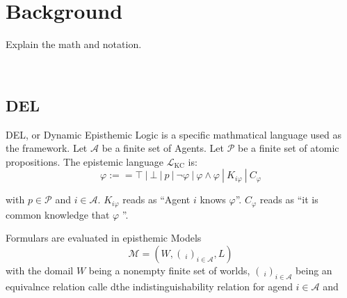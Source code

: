 \chapter{Background}\label{chap:background}
Explain the math and notation.

 \\

\section{DEL}
DEL, or Dynamic Episthemic Logic is a specific mathmatical language used as the framework.
Let $\mathcal{A}$ be a finite set of Agents. Let $\mathcal{P}$ be a finite set of atomic propositions.
The epistemic language $\mathcal{L}_{\text{KC}}$ is: \\
$$
\varphi :== \top \ | \ \bot \ | \ p \ | \ \neg \varphi \ | \ \varphi \wedge \varphi \ | \ K_{i\varphi} \ | \ C_\varphi
$$

with $p \in \mathcal{P}$ and $i \in \mathcal{A}$.
$K_{i\varphi}$ reads as ``Agent $i$ knows $\varphi$''. $C_\varphi$ reads as ``it is common knowledge that $\varphi$ ''.

Formulars are evaluated in episthemic Models
$$
\mathcal{M}=(W, (~_i)_{i \in \mathcal{A}}, L)
$$
with the domail $W$ being a nonempty finite set of worlds, $(~_i)_{i \in \mathcal{A}}$ being an equivalnce relation calle dthe indistinguishability relation for agend $i \in \mathcal{A}$ and 
